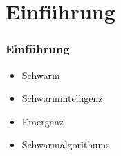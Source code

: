 \section{Einführung}
\begin{frame}
	\frametitle{Einführung}
\begin{itemize}
\item Schwarm
\item Schwarmintelligenz
\item Emergenz
\item Schwarmalgorithums
\end{itemize}


\end{frame}